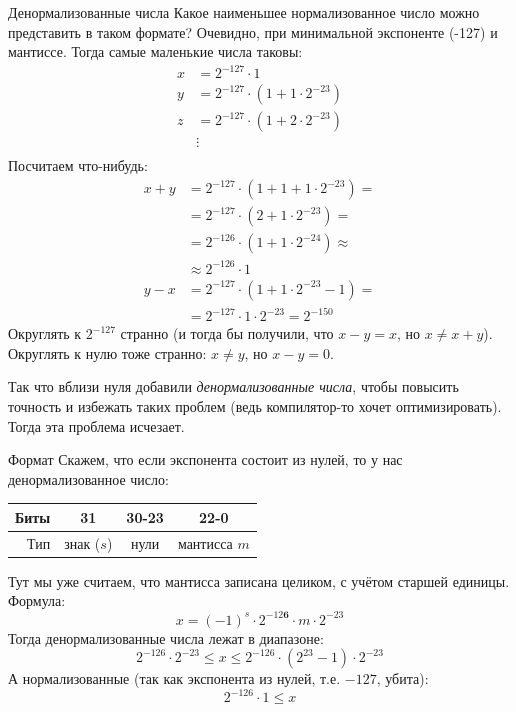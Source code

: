 \begin{frame}{Денормализованные числа}
	Какое наименьшее нормализованное число можно представить в таком формате?
	Очевидно, при минимальной экспоненте (-127) и мантиссе.
	Тогда самые маленькие числа таковы:
	\begin{align*}
		x &= 2^{-127} \cdot 1 \\
		y &= 2^{-127} \cdot (1 + 1 \cdot 2^{-23}) \\
		z &= 2^{-127} \cdot (1 + 2 \cdot 2^{-23}) \\
		& \vdots \\
	\end{align*}
	Посчитаем что-нибудь:
	\begin{align*}
		x + y &= 2^{-127} \cdot (1 + 1 + 1 \cdot 2^{-23}) = \\
		      &= 2^{-127} \cdot (2 + 1 \cdot 2^{-23}) = \\
		      &= 2^{-126} \cdot (1 + 1 \cdot 2^{-24}) \approx \\
		      &\approx 2^{-126} \cdot 1 \\
		y - x &= 2^{-127} \cdot (1 + 1 \cdot 2^{-23} - 1) = \\
		      &= 2^{-127} \cdot 1 \cdot 2^{-23} = 2^{-150}
	\end{align*}
	Округлять к $2^{-127}$ странно (и тогда бы получили, что $x-y=x$, но $x\neq x + y$).
	Округлять к нулю тоже странно: $x \neq y$, но $x - y = 0$.

	Так что вблизи нуля добавили \textit{денормализованные числа}, чтобы повысить точность и избежать таких проблем (ведь компилятор-то хочет оптимизировать).
	Тогда эта проблема исчезает.
\end{frame}

\begin{frame}{Формат}
	Скажем, что если экспонента состоит из нулей, то у нас денормализованное число:
	\begin{center}
		\begin{tabular}{|r|c|c|c|}
			\hline
			Биты & 31 & 30-23 & 22-0 \\\hline
			Тип & знак ($s$) & нули & мантисса $m$ \\\hline
		\end{tabular}
	\end{center}
	Тут мы уже считаем, что мантисса записана целиком, с учётом старшей единицы.
	Формула:
	\[
		x = (-1)^s \cdot 2^{-12\textbf{6}} \cdot m \cdot 2^{-23}
	\]
	Тогда денормализованные числа лежат в диапазоне:
	\[
		2^{-126} \cdot 2^{-23} \le x \le 2^{-126} \cdot (2^{23}-1) \cdot2^{-23}
	\]
	А нормализованные (так как экспонента из нулей, т.е. $-127$, убита):
	\[
		2^{-126} \cdot 1 \le x
	\]
\end{frame}

